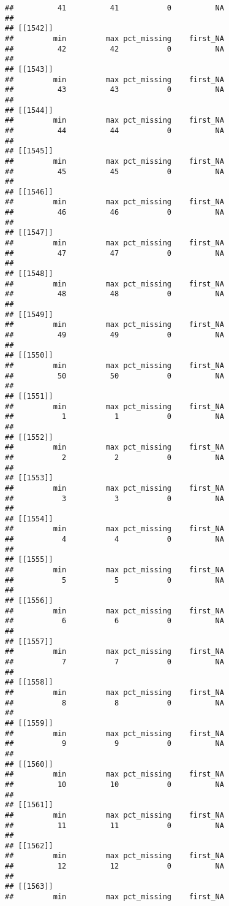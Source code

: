 \documentclass[
]{article}
\begin{document}
\begin{verbatim}
##          41          41           0          NA 
## 
## [[1542]]
##         min         max pct_missing    first_NA 
##          42          42           0          NA 
## 
## [[1543]]
##         min         max pct_missing    first_NA 
##          43          43           0          NA 
## 
## [[1544]]
##         min         max pct_missing    first_NA 
##          44          44           0          NA 
## 
## [[1545]]
##         min         max pct_missing    first_NA 
##          45          45           0          NA 
## 
## [[1546]]
##         min         max pct_missing    first_NA 
##          46          46           0          NA 
## 
## [[1547]]
##         min         max pct_missing    first_NA 
##          47          47           0          NA 
## 
## [[1548]]
##         min         max pct_missing    first_NA 
##          48          48           0          NA 
## 
## [[1549]]
##         min         max pct_missing    first_NA 
##          49          49           0          NA 
## 
## [[1550]]
##         min         max pct_missing    first_NA 
##          50          50           0          NA 
## 
## [[1551]]
##         min         max pct_missing    first_NA 
##           1           1           0          NA 
## 
## [[1552]]
##         min         max pct_missing    first_NA 
##           2           2           0          NA 
## 
## [[1553]]
##         min         max pct_missing    first_NA 
##           3           3           0          NA 
## 
## [[1554]]
##         min         max pct_missing    first_NA 
##           4           4           0          NA 
## 
## [[1555]]
##         min         max pct_missing    first_NA 
##           5           5           0          NA 
## 
## [[1556]]
##         min         max pct_missing    first_NA 
##           6           6           0          NA 
## 
## [[1557]]
##         min         max pct_missing    first_NA 
##           7           7           0          NA 
## 
## [[1558]]
##         min         max pct_missing    first_NA 
##           8           8           0          NA 
## 
## [[1559]]
##         min         max pct_missing    first_NA 
##           9           9           0          NA 
## 
## [[1560]]
##         min         max pct_missing    first_NA 
##          10          10           0          NA 
## 
## [[1561]]
##         min         max pct_missing    first_NA 
##          11          11           0          NA 
## 
## [[1562]]
##         min         max pct_missing    first_NA 
##          12          12           0          NA 
## 
## [[1563]]
##         min         max pct_missing    first_NA 

\end{verbatim}
\end{document}
